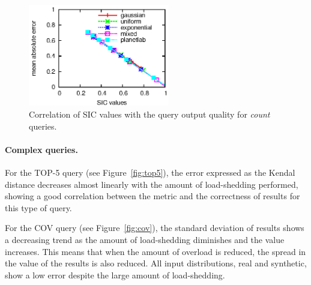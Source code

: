 \begin{figure}
\centering
\includegraphics[width=0.55\textwidth]{img/tesi/count1}
\caption{Correlation of SIC values with the query output quality for \emph{count} queries.}
\label{fig:agg-count}
\end{figure}
\paragraph{Complex queries.}
For the \textnormal{TOP-5} query (see Figure~\ref{fig:top5}), the error expressed as the Kendal distance
decreases almost linearly with the amount of \mbox{load-shedding} performed, showing a good correlation
between the \sic metric and the correctness of results for this type of query. 

For the \textnormal{COV} query (see Figure~\ref{fig:cov}), the standard deviation of results shows a
decreasing trend as the amount of \mbox{load-shedding} diminishes and the \sic value increases. This means that
when the amount of overload is reduced, the spread in the value of the results is also reduced.
All input distributions, real and synthetic, show a low error despite the large amount of
\mbox{load-shedding}. 

